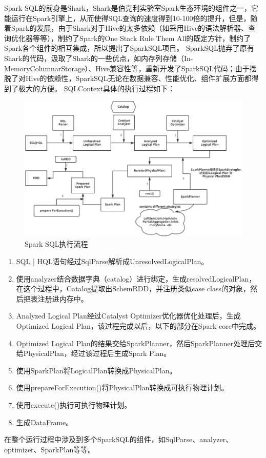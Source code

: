 \documentclass[UTF8]{report}
\begin{document}
Spark SQL的前身是Shark，Shark是伯克利实验室Spark生态环境的组件之一，它能运行在Spark引擎上，从而使得SQL查询的速度得到10-100倍的提升，但是，随着Spark的发展，由于Shark对于Hive的太多依赖（如采用Hive的语法解析器、查询优化器等等），制约了Spark的One Stack Rule Them All的既定方针，制约了Spark各个组件的相互集成，所以提出了SparkSQL项目。
SparkSQL抛弃了原有Shark的代码，汲取了Shark的一些优点，如内存列存储（In-MemoryColumnarStorage）、Hive兼容性等，重新开发了SparkSQL代码；由于摆脱了对Hive的依赖性，SparkSQL无论在数据兼容、性能优化、组件扩展方面都得到了极大的方便。
SQLContext具体的执行过程如下：
\begin{figure}[htbp]
    \centering
    \includegraphics[width=\linewidth]{spark/spark-sql.png}
    \caption{Spark SQL执行流程}
    \label{fig:spark_sql}
\end{figure}

\begin{enumerate}[1)]
\item SQL | HQL语句经过SqlParse解析成UnresolvedLogicalPlan。
\item 使用analyzer结合数据字典（catalog）进行绑定，生成resolvedLogicalPlan，在这个过程中，Catalog提取出SchemRDD，并注册类似case class的对象，然后把表注册进内存中。
\item Analyzed Logical Plan经过Catalyst Optimizer优化器优化处理后，生成Optimized Logical Plan，该过程完成以后，以下的部分在Spark core中完成。
\item Optimized Logical Plan的结果交给SparkPlanner，然后SparkPlanner处理后交给PhysicalPlan，经过该过程后生成Spark Plan。
\item 使用SparkPlan将LogicalPlan转换成PhysicalPlan。
\item 使用prepareForExecution()将PhysicalPlan转换成可执行物理计划。
\item 使用execute()执行可执行物理计划。
\item 生成DataFrame。
\end{enumerate}
在整个运行过程中涉及到多个SparkSQL的组件，如SqlParse、analyzer、optimizer、SparkPlan等等。
\end{document}
